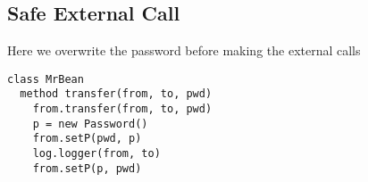 \subsection{Safe External Call}

Here we overwrite the password before making the external calls

\begin{lstlisting}[language=chainmail, mathescape=true, frame=lines]
class MrBean
  method transfer(from, to, pwd)
    from.transfer(from, to, pwd)
    p = new Password()
    from.setP(pwd, p)
    log.logger(from, to)
    from.setP(p, pwd)
\end{lstlisting}
